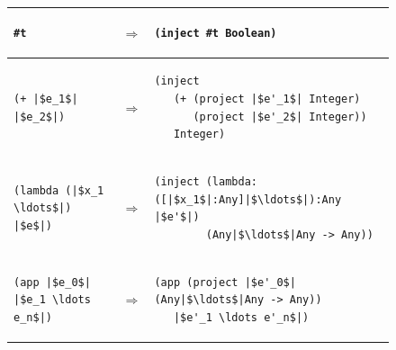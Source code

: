 \documentclass[11pt]{book}
\begin{document}
\begin{figure}[tbp]
\centering
\begin{tabular}{|lll|} \hline
\begin{minipage}{0.25\textwidth}
\begin{lstlisting}
#t
\end{lstlisting}
\end{minipage}
&
$\Rightarrow$
&
\begin{minipage}{0.6\textwidth}
\begin{lstlisting}
(inject #t Boolean)
\end{lstlisting}
\end{minipage}
\\[2ex]\hline
\begin{minipage}{0.25\textwidth}
\begin{lstlisting}
(+ |$e_1$| |$e_2$|)
\end{lstlisting}
\end{minipage}
&
$\Rightarrow$
&
\begin{minipage}{0.6\textwidth}
\begin{lstlisting}
(inject
   (+ (project |$e'_1$| Integer)
      (project |$e'_2$| Integer))
   Integer)
\end{lstlisting}
\end{minipage}
\\[2ex]\hline
\begin{minipage}{0.25\textwidth}
\begin{lstlisting}
(lambda (|$x_1 \ldots$|) |$e$|)
\end{lstlisting}
\end{minipage}
&
$\Rightarrow$
&
\begin{minipage}{0.6\textwidth}
\begin{lstlisting}
(inject (lambda: ([|$x_1$|:Any]|$\ldots$|):Any |$e'$|)
        (Any|$\ldots$|Any -> Any))
\end{lstlisting}
\end{minipage}
\\[2ex]\hline
\begin{minipage}{0.25\textwidth}
\begin{lstlisting}
(app |$e_0$| |$e_1 \ldots e_n$|)
\end{lstlisting}
\end{minipage}
&
$\Rightarrow$
&
\begin{minipage}{0.6\textwidth}
\begin{lstlisting}
(app (project |$e'_0$| (Any|$\ldots$|Any -> Any))
   |$e'_1 \ldots e'_n$|)
\end{lstlisting}

\end{minipage}
\end{tabular}
\end{figure}
\end{document}
